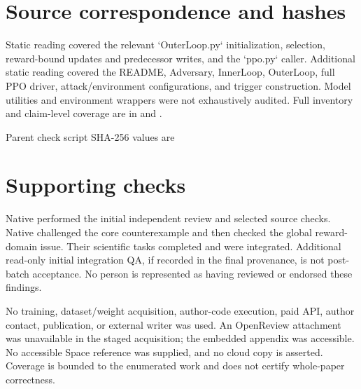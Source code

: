 \documentclass[10pt]{article}
\begin{document}
\section*{Source correspondence and hashes}
Static reading covered the relevant `OuterLoop.py` initialization, selection, reward-bound updates and predecessor writes, and the `ppo.py` caller. Additional static reading covered the README, Adversary, InnerLoop, OuterLoop, full PPO driver, attack/environment configurations, and trigger construction. Model utilities and environment wrappers were not exhaustively audited. Full inventory and claim-level coverage are in and .\par
Parent check script SHA-256 values are\par
\section*{Supporting checks}
Native performed the initial independent review and selected source checks. Native challenged the core counterexample and then checked the global reward-domain issue. Their scientific tasks completed and were integrated. Additional read-only initial integration QA, if recorded in the final provenance, is not post-batch acceptance. No person is represented as having reviewed or endorsed these findings.\par
No training, dataset/weight acquisition, author-code execution, paid API, author contact, publication, or external writer was used. An OpenReview attachment was unavailable in the staged acquisition; the embedded appendix was accessible. No accessible Space reference was supplied, and no cloud copy is asserted. Coverage is bounded to the enumerated work and does not certify whole-paper correctness.\par
\end{document}
